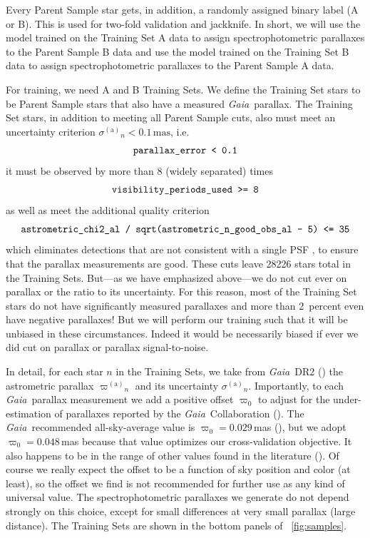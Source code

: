 \documentclass[modern]{aastex62}
\newcommand{\code}[1]{\texttt{\detokenize{#1}}}
\newcommand{\acronym}[1]{{\small{#1}}}
\newcommand{\project}[1]{\textsl{#1}}
\newcommand{\gaia}{\project{Gaia}}
\newcommand{\gparallax}{{\varpi^{(\mathrm{a})}}}
\newcommand{\gsigma}{{\sigma^{(\mathrm{a})}}}
\begin{document}
Every Parent Sample star gets, in addition, a randomly assigned binary
label (A or B).
This is used for two-fold validation and jackknife.
In short, we will
use the model trained on the Training Set A data to assign spectrophotometric parallaxes
to the Parent Sample B data and
use the model trained on the Training Set B data to assign spectrophotometric parallaxes
to the Parent Sample A data.

For training, we need A and B Training Sets.
We define the Training Set stars to be Parent Sample stars that also
have a measured \gaia\ parallax.
The Training Set stars, in addition to meeting all Parent Sample cuts,
also must meet an uncertainty criterion $\gsigma_n < 0.1\,\mathrm{mas}$, i.e. 
\begin{equation}
\code{parallax_error < 0.1}
\end{equation}
it must be observed by more than $8$ (widely separated) times
\begin{equation}
\code{visibility_periods_used >= 8}
\end{equation}
as well as meet the additional quality criterion
\begin{equation}
\code{astrometric_chi2_al / sqrt(astrometric_n_good_obs_al - 5) <= 35}
\end{equation}
which eliminates detections that are not consistent with a single PSF \citep[see][]{calj},
to ensure that the parallax measurements are good.
These cuts leave 28226 stars total in the Training Sets.
But---as we have emphasized above---we do not cut ever on parallax or
the ratio to its uncertainty. For this reason, most of the Training Set stars
do not have significantly measured parallaxes and more than 2~percent even have
negative parallaxes!
But we will perform our training such that it will be unbiased in these
circumstances.
Indeed it would be necessarily biased if ever we did cut on parallax or
parallax signal-to-noise.

In detail,
for each star $n$ in the Training Sets, we take from \gaia\ \acronym{DR2} (\citealt{gaiadr2})
the astrometric parallax $\gparallax_n$ and its uncertainty $\gsigma_n$.
Importantly, to each \gaia\ parallax measurement we add a positive
offset $\varpi_0$ to adjust for the under-estimation of
parallaxes reported by the \gaia\ Collaboration (\citealt{lindegren}).
The \gaia\ recommended all-sky-average value is $\varpi_0=0.029$\,mas (\citealt{lindegren}),
but we adopt $\varpi_0 = 0.048$\,mas because that value
optimizes our cross-validation objective.
It also happens to be in the range of other values found in the literature (\citealt{arenou, zinn}).
Of course we really expect the offset to be a function of sky position and color (at least),
so the offset we find is not recommended for further use as any kind of universal value.
The spectrophotometric parallaxes we generate
do not depend strongly on this choice, except
for small differences at very small parallax (large distance).
The Training Sets are shown in the bottom panels of \figurename~\ref{fig:samples}.
\end{document}
